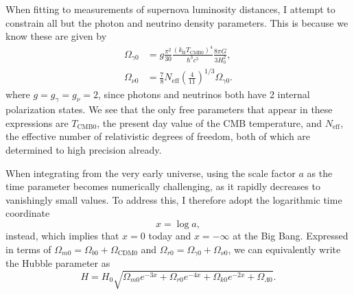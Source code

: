 \documentclass{aa}
\numberwithin{equation}{section}
\numberwithin{table}{section}
\numberwithin{figure}{section}
\begin{document}
When fitting to measurements of supernova luminosity distances, I attempt to constrain all but the photon and neutrino density parameters. This is because we know these are given by
\begin{align}
    \Omega_{\gamma0} &= g\frac{\pi^2}{30}\frac{\left(k_\text{B}T_{\text{CMB}0}\right)^4}{\hbar^3c^5}\frac{8\pi G}{3H_0^2},
    \\
    \Omega_{\nu0} &= \frac{7}{8}N_\text{eff}\left(\frac{4}{11}\right)^{1/3}\Omega_{\gamma0}.
\end{align}
where $g=g_\gamma=g_\nu=2$, since photons and neutrinos both have 2 internal polarization states. We see that the only free parameters that appear in these expressions are $T_{\text{CMB}0}$, the present day value of the CMB temperature, and $N_\text{eff}$, the effective number of relativistic degrees of freedom, both of which are determined to high precision already. 

When integrating from the very early universe, using the scale factor $a$ as the time parameter becomes numerically challenging, as it rapidly decreases to vanishingly small values. To address this, I therefore adopt the logarithmic time coordinate
\begin{equation}
    x = \log a,
\end{equation}
instead, which implies that $x=0$ today and $x=-\infty$ at the Big Bang. Expressed in terms of $\Omega_{m0}=\Omega_{b0}+\Omega_{\text{CDM}0}$ and $\Omega_{r0}=\Omega_{\gamma0}+\Omega_{\nu0}$, we can equivalently write the Hubble parameter as
\begin{equation}
    H = H_0 \sqrt{\Omega_{m0} e^{-3x} + \Omega_{r0} e^{-4x} + \Omega_{k0} e^{-2x} + \Omega_{\Lambda 0}}.
\end{equation}
\end{document}
